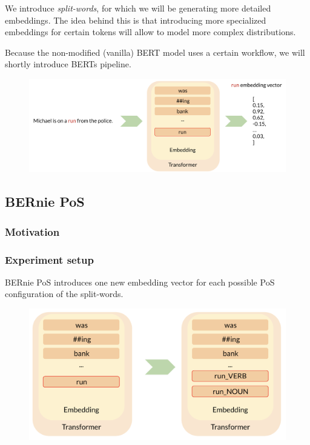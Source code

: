 \documentclass[a4paper,12pt,twoside,openright]{report}
\begin{document}
We introduce \textit{split-words}, for which we will be generating more detailed embeddings.
The idea behind this is that introducing more specialized embeddings for certain tokens will allow to model more complex distributions.

Because the non-modified (vanilla) BERT model uses a certain workflow, we will shortly introduce BERTs pipeline.

\begin{figure}[h]
	\center
  \includegraphics[width=\linewidth]{./assets/experiments/pipeline_vanilla_BERT.png}
  \caption{}
  \label{fig:cbow_skipgram}
\end{figure}


\subsection{BERnie PoS}

\subsubsection{Motivation}

\subsubsection{Experiment setup}

BERnie PoS introduces one new embedding vector for each possible PoS configuration of the split-words.

\begin{figure}[h]
	\center
  \includegraphics[width=\linewidth]{./assets/experiments/pipeline_model_BERnie_POS.png}
  \caption{}
  \label{fig:cbow_skipgram}
\end{figure}
\end{document}
